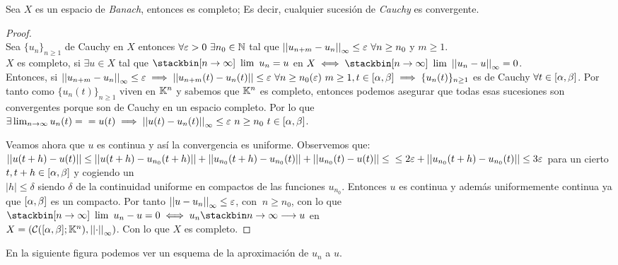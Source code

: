 \begin{proposicion} Sea $X$ es un espacio de \textit{Banach}, entonces es completo; Es decir, cualquier sucesión de \textit{Cauchy} es convergente.
\begin{proof}\ \\
Sea $\{u_n \}_{n\geq 1}$ de Cauchy en $X$ entonces $\forall \varepsilon >0 \ \exists n_0 \in \mathbb{N}$ tal que $ {\left|\left|u_{n+m}-u_n\right|\right|}_\infty \leq\varepsilon \  \forall n \geq n_0$ y $m\geq1$.\\
$X$ es completo, si $\exists u \in X$  tal que $\limite{}{\ntiende}{u_n}=u$ en $X\iff\limite{}{\ntiende}{\norminf{u_n-u}}=0$.\\
Entonces, si $\left|\left|u_{n+m}-u_n\right|\right|_\infty\leq \varepsilon \implies \left|\left|u_{n+m}(t)-u_n(t)\right|\right| \leq  
\varepsilon \ \forall n \geq n_0( \varepsilon ) \ m \geq 1,\\
t \in [\alpha,\beta] \implies \{u_n(t)\}_{n\geq 1}$ es de Cauchy $\forall t \in [\alpha,\beta]$. Por tanto
como $\{u_n(t)\}_{n\geq 1}$ viven en $\mathbb{K}^n$ y sabemos que $\mathbb{K}^n$ es completo, entonces podemos asegurar que todas esas sucesiones son convergentes porque son de Cauchy en un espacio completo. 
Por lo que $\exists \lim_{n\rightarrow\infty}{u_n(t)}=\\
=u(t) \implies \left|\left|u(t)-u_n(t)\right|\right|_\infty\leq \varepsilon \ n\geq n_0 \ t \in [\alpha,\beta]$.

Veamos ahora que $u$ es continua y así la convergencia es uniforme. Observemos que:\\
$\left|\left|u(t+h)-u(t)\right|\right| \leq \left|\left|u(t+h)-u_{n_0}(t+h)\right|\right| + \left|\left|u_{n_0}(t+h)-u_{n_0}(t)\right|\right| + \left|\left|u_{n_0}(t)-u(t)\right|\right| \leq\\
\leq2\varepsilon+\left|\left|u_{n_0}(t+h)-u_{n_0}(t)\right|\right|\leq 3\varepsilon$ para un cierto $t,t+h\in[\alpha,\beta]$ y cogiendo un\\
$|h|\leq \delta$ siendo $\delta$ de la continuidad uniforme en compactos de las funciones $u_{n_0}$.
Entonces $u$ es continua y además uniformemente continua ya que $[\alpha,\beta]$ es un compacto. 
Por tanto ${\left|\left|u-u_n\right|\right|}_\infty \leq\varepsilon$, con $\ n\geq n_0$, con lo que $\limite{}{\ntiende}{u_n-u}=0 \iff u_n\limited{u}$ en\\
$X =(\mathcal{C}([\alpha,\beta];\mathbb{K}^n),\left|\left|\cdot\right|\right|_\infty)$. Con lo que $X$ es completo.
\end{proof}
En la siguiente figura podemos ver un esquema de la aproximación de $u_n$ a $u$.
\begin{figura}\ \begin{center}\end{center}\end{figura}

\end{proposicion}

